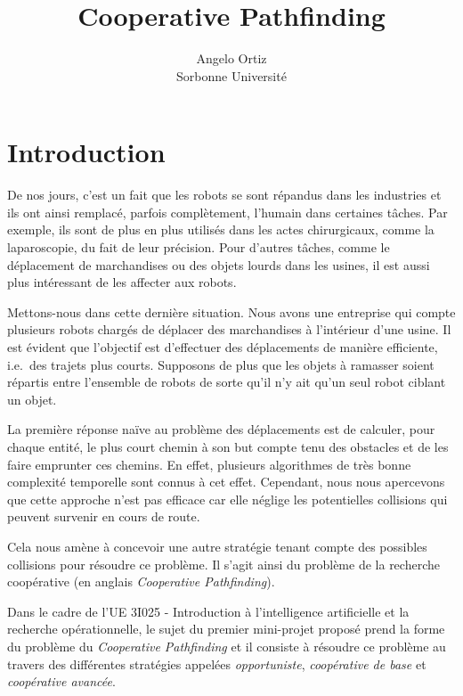 \documentclass[letterpaper]{article}
\begin{document}
\title{Cooperative Pathfinding}

\author{Angelo Ortiz \\
Sorbonne Universit\'e}


\maketitle

\section{Introduction}
De nos jours, c'est un fait que les robots se sont r\'epandus dans les industries et ils ont ainsi remplac\'e, parfois compl\`etement, l'humain dans certaines t\^aches. 
Par exemple, ils sont de plus en plus utilis\'es dans les actes chirurgicaux, comme la laparoscopie, du fait de leur pr\'ecision.
Pour d'autres t\^aches, comme le d\'eplacement de marchandises ou des objets lourds dans les usines, il est aussi plus int\'eressant de les affecter aux robots.

Mettons-nous dans cette derni\`ere situation.
Nous avons une entreprise qui compte plusieurs robots charg\'es de d\'eplacer des marchandises \`a l'int\'erieur d'une usine. 
Il est \'evident que l'objectif est d'effectuer des d\'eplacements de mani\`ere efficiente, i.e.\ des trajets plus courts. 
Supposons de plus que les objets \`a ramasser soient r\'epartis entre l'ensemble de robots de sorte qu'il n'y ait qu'un seul robot ciblant un objet.

La premi\`ere r\'eponse na\"ive au probl\`eme des d\'eplacements est de calculer, pour chaque entit\'e, le plus court chemin \`a son but compte tenu des obstacles et de les faire emprunter ces chemins.
En effet, plusieurs algorithmes de tr\`es bonne complexit\'e temporelle  sont connus \`a cet effet.
Cependant, nous nous apercevons que cette approche n'est pas efficace car elle n\'eglige les potentielles collisions qui peuvent survenir en cours de route.

Cela nous am\`ene \`a concevoir une autre strat\'egie tenant compte des possibles collisions pour r\'esoudre ce probl\`eme.
Il s'agit ainsi du probl\`eme de la recherche coop\'erative (en anglais \textit{Cooperative Pathfinding}).

Dans le cadre de l'UE 3I025 - Introduction \`a l'intelligence artificielle et la recherche op\'erationnelle, le sujet du premier mini-projet propos\'e prend la forme du probl\`eme du \textit{Cooperative Pathfinding} et il consiste \`a r\'esoudre ce probl\`eme au travers des diff\'erentes strat\'egies appel\'ees \textit{opportuniste}, \textit{coop\'erative de base} et \textit{coop\'erative avanc\'ee}.
\end{document}
